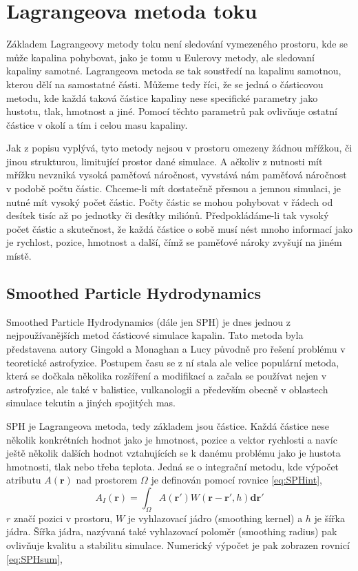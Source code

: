 \section{Lagrangeova metoda toku}
Základem Lagrangeovy metody toku není sledování vymezeného prostoru, kde se může kapalina pohybovat, jako je tomu u Eulerovy metody, ale sledovaní kapaliny samotné. Lagrangeova metoda se tak soustředí na kapalinu samotnou, kterou dělí na samostatné části. Můžeme tedy říci, že se jedná o částicovou metodu, kde každá taková částice kapaliny nese specifické parametry jako hustotu, tlak, hmotnost a jiné. Pomocí těchto parametrů pak ovlivňuje ostatní částice v okolí a tím i celou masu kapaliny.

Jak z popisu vyplývá, tyto metody nejsou v prostoru omezeny žádnou mřížkou, či jinou strukturou, limitující prostor dané simulace. A ačkoliv z nutnosti mít mřížku nevzniká vysoká paměťová náročnost, vyvstává nám paměťová náročnost v podobě počtu částic. Chceme-li mít dostatečně přesnou a jemnou simulaci, je nutné mít vysoký počet částic. Počty částic se mohou pohybovat v řádech od desítek tisíc až po jednotky či desítky miliónů. Předpokládáme-li tak vysoký počet částic a skutečnost, že každá částice o sobě musí nést mnoho informací jako je rychlost, pozice, hmotnost a další, čímž se paměťové nároky zvyšují na jiném místě. 

\subsection{Smoothed Particle Hydrodynamics}
Smoothed Particle Hydrodynamics (dále jen SPH) je dnes jednou z nejpoužívanějších metod částicové simulace kapalin. Tato metoda byla představena autory Gingold a Monaghan \cite{Monaghan77} a Lucy \cite{Lucy77} původně pro řešení problému v teoretické astrofyzice. Postupem času se z ní stala ale velice populární metoda, která se dočkala několika rozšíření a modifikací a začala se používat nejen v astrofyzice, ale také v balistice, vulkanologii a především obecně v oblastech simulace tekutin a jiných spojitých mas.

SPH je Lagrangeova metoda, tedy základem jsou částice. Každá částice nese několik konkrétních hodnot jako je hmotnost, pozice a vektor rychlosti a navíc ještě několik dalších hodnot vztahujících se k danému problému jako je hustota hmotnosti, tlak nebo třeba teplota. Jedná se o integrační metodu, kde výpočet atributu $A(\mathbf{r})$ nad prostorem $\Omega$ je definován pomocí rovnice \ref{eq:SPHint},
\begin{equation}
    A_I(\mathbf{r}) = \int_\Omega A(\mathbf{r}')W(\mathbf{r} - \mathbf{r'},h)\mathbf{dr}'
    \label{eq:SPHint}
\end{equation}
$r$ značí pozici v prostoru, $W$ je vyhlazovací jádro (smoothing kernel) a $h$ je šířka jádra. Šířka jádra, nazývaná také vyhlazovací poloměr (smoothing radius) pak ovlivňuje kvalitu a stabilitu simulace.
Numerický výpočet je pak zobrazen rovnicí \ref{eq:SPHsum},

